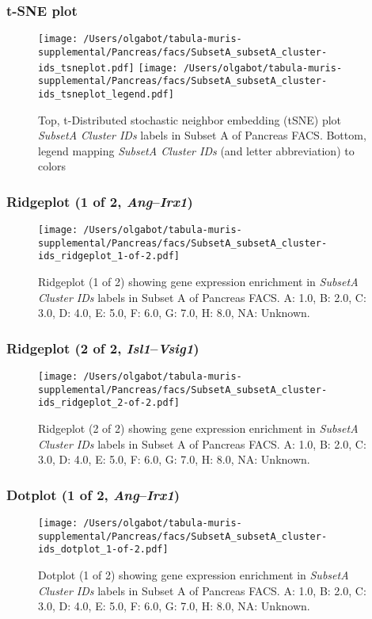 \clearpage
\subsubsection{t-SNE plot}
\begin{figure}[h]
\centering
\texttt{[image: /Users/olgabot/tabula-muris-supplemental/Pancreas/facs/SubsetA\_subsetA\_cluster-ids\_tsneplot.pdf]}
\texttt{[image: /Users/olgabot/tabula-muris-supplemental/Pancreas/facs/SubsetA\_subsetA\_cluster-ids\_tsneplot\_legend.pdf]}
\caption{Top, t-Distributed stochastic neighbor embedding (tSNE) plot  \emph{SubsetA Cluster IDs} labels in Subset A of Pancreas FACS. Bottom, legend mapping \emph{SubsetA Cluster IDs} (and letter abbreviation) to colors}
\end{figure}


\clearpage

\subsubsection{Ridgeplot (1 of 2, \emph{Ang}--\emph{Irx1})}
\begin{figure}[h]
\centering
\texttt{[image: /Users/olgabot/tabula-muris-supplemental/Pancreas/facs/SubsetA\_subsetA\_cluster-ids\_ridgeplot\_1-of-2.pdf]}

\caption{ Ridgeplot (1 of 2)  showing gene expression enrichment in \emph{SubsetA Cluster IDs} labels in Subset A of Pancreas FACS. A: 1.0, B: 2.0, C: 3.0, D: 4.0, E: 5.0, F: 6.0, G: 7.0, H: 8.0, NA: Unknown.}
\end{figure}


\clearpage

\subsubsection{Ridgeplot (2 of 2, \emph{Isl1}--\emph{Vsig1})}
\begin{figure}[h]
\centering
\texttt{[image: /Users/olgabot/tabula-muris-supplemental/Pancreas/facs/SubsetA\_subsetA\_cluster-ids\_ridgeplot\_2-of-2.pdf]}

\caption{ Ridgeplot (2 of 2)  showing gene expression enrichment in \emph{SubsetA Cluster IDs} labels in Subset A of Pancreas FACS. A: 1.0, B: 2.0, C: 3.0, D: 4.0, E: 5.0, F: 6.0, G: 7.0, H: 8.0, NA: Unknown.}
\end{figure}


\clearpage

\subsubsection{Dotplot (1 of 2, \emph{Ang}--\emph{Irx1})}
\begin{figure}[h]
\centering
\texttt{[image: /Users/olgabot/tabula-muris-supplemental/Pancreas/facs/SubsetA\_subsetA\_cluster-ids\_dotplot\_1-of-2.pdf]}

\caption{ Dotplot (1 of 2)  showing gene expression enrichment in \emph{SubsetA Cluster IDs} labels in Subset A of Pancreas FACS. A: 1.0, B: 2.0, C: 3.0, D: 4.0, E: 5.0, F: 6.0, G: 7.0, H: 8.0, NA: Unknown.}
\end{figure}


